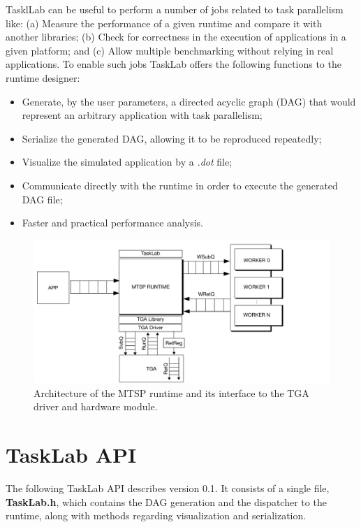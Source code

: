 TasklLab can be useful  to perform a number of jobs related to task parallelism like: (a) Measure the performance of a given runtime and compare it with another libraries; (b) Check for correctness in the execution of applications in a given platform; and (c) Allow multiple benchmarking without relying in real applications. To enable such jobs TaskLab offers the following functions to the runtime designer:
\begin{itemize}
\item Generate, by the user parameters, a directed acyclic graph (DAG) that would represent an arbitrary application with task parallelism;
\item Serialize the generated DAG, allowing it to be reproduced repeatedly;
\item Visualize the simulated application by a \textit{.dot} file;
\item Communicate directly with the runtime in order to execute the generated DAG file;
\item Faster and practical performance analysis.
\end{itemize}

\begin{figure}[ht]
  \centering
  \includegraphics[width=13cm]{figures/MTSP-Driver.pdf}
  \caption{Architecture of the MTSP runtime and its interface to the TGA  driver and hardware module.}
  \label{fig:arch}
\end{figure}

\section{TaskLab API}

The following TaskLab API describes version 0.1. It consists of a single file, \textbf{TaskLab.h}, which contains the DAG generation and the dispatcher to the runtime, along with methods regarding visualization and serialization.

